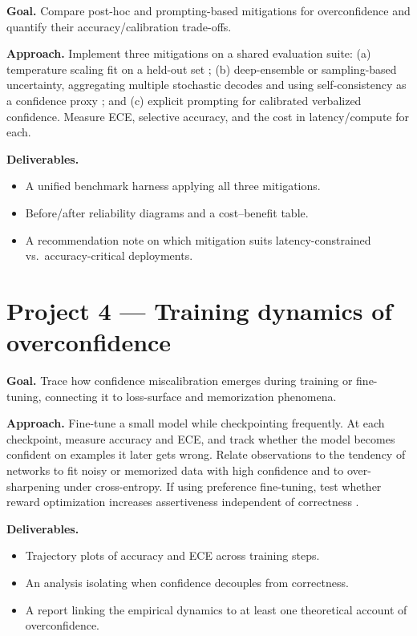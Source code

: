 \documentclass[11pt]{article}
\begin{document}
\textbf{Goal.} Compare post-hoc and prompting-based mitigations for
overconfidence and quantify their accuracy/calibration trade-offs.

\textbf{Approach.} Implement three mitigations on a shared evaluation suite:
(a) temperature scaling fit on a held-out set \citep{guo2017calibration};
(b) deep-ensemble or sampling-based uncertainty, aggregating multiple stochastic
decodes and using self-consistency as a confidence proxy
\citep{lakshminarayanan2017simple,wang2023selfconsistency}; and (c) explicit
prompting for calibrated verbalized confidence. Measure ECE, selective accuracy,
and the cost in latency/compute for each.

\textbf{Deliverables.}
\begin{itemize}[leftmargin=1.5em]
  \item A unified benchmark harness applying all three mitigations.
  \item Before/after reliability diagrams and a cost--benefit table.
  \item A recommendation note on which mitigation suits latency-constrained vs.\
  accuracy-critical deployments.
\end{itemize}

\section*{Project 4 --- Training dynamics of overconfidence}

\textbf{Goal.} Trace how confidence miscalibration emerges during training or
fine-tuning, connecting it to loss-surface and memorization phenomena.

\textbf{Approach.} Fine-tune a small model while checkpointing frequently. At
each checkpoint, measure accuracy and ECE, and track whether the model becomes
confident on examples it later gets wrong. Relate observations to the tendency of
networks to fit noisy or memorized data with high confidence
\citep{zhang2021understanding} and to over-sharpening under cross-entropy. If
using preference fine-tuning, test whether reward optimization increases
assertiveness independent of correctness \citep{ouyang2022training}.

\textbf{Deliverables.}
\begin{itemize}[leftmargin=1.5em]
  \item Trajectory plots of accuracy and ECE across training steps.
  \item An analysis isolating when confidence decouples from correctness.
  \item A report linking the empirical dynamics to at least one theoretical
  account of overconfidence.
\end{itemize}
\end{document}
